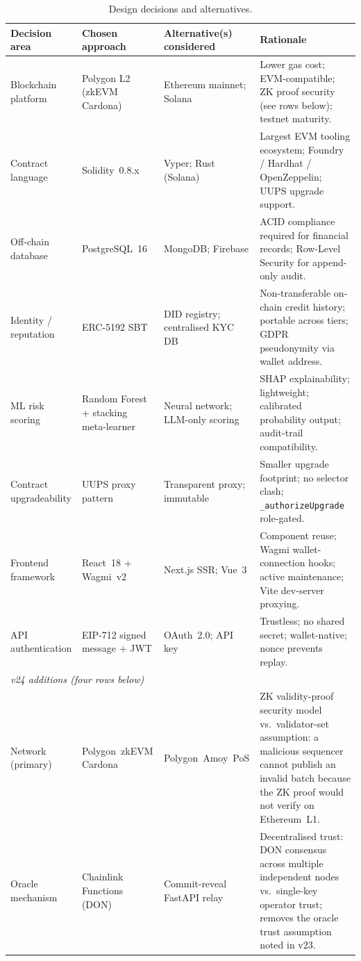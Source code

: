 \begin{table}[H]
\centering
\caption{Design decisions and alternatives.}
\label{tab:design-decisions}
\small
\renewcommand{\arraystretch}{1.3}
\begin{tabular}{p{2.8cm}p{2.9cm}p{2.9cm}p{3.7cm}}
\hline
\textbf{Decision area} & \textbf{Chosen approach} & \textbf{Alternative(s) considered} & \textbf{Rationale} \\
\hline
Blockchain platform  & Polygon L2 (zkEVM Cardona) & Ethereum mainnet; Solana & Lower gas cost; EVM-compatible; ZK proof security (see rows below); testnet maturity. \\
Contract language    & Solidity~0.8.x         & Vyper; Rust (Solana) & Largest EVM tooling ecosystem; Foundry / Hardhat / OpenZeppelin; UUPS upgrade support. \\
Off-chain database   & PostgreSQL~16            & MongoDB; Firebase       & ACID compliance required for financial records; Row-Level Security for append-only audit. \\
Identity / reputation & ERC-5192 SBT            & DID registry; centralised KYC DB & Non-transferable on-chain credit history; portable across tiers; GDPR pseudonymity via wallet address. \\
ML risk scoring      & Random Forest + stacking meta-learner & Neural network; LLM-only scoring & SHAP explainability; lightweight; calibrated probability output; audit-trail compatibility. \\
Contract upgradeability & UUPS proxy pattern    & Transparent proxy; immutable & Smaller upgrade footprint; no selector clash; \texttt{\_authorizeUpgrade} role-gated. \\
Frontend framework   & React~18 + Wagmi~v2     & Next.js SSR; Vue~3      & Component reuse; Wagmi wallet-connection hooks; active maintenance; Vite dev-server proxying. \\
API authentication   & EIP-712 signed message + JWT & OAuth~2.0; API key & Trustless; no shared secret; wallet-native; nonce prevents replay. \\
\hline
\multicolumn{4}{l}{\textit{v24 additions (four rows below)}} \\
\hline
Network (primary)    & Polygon~zkEVM Cardona   & Polygon~Amoy~PoS        & ZK validity-proof security model vs.\ validator-set assumption: a malicious sequencer cannot publish an invalid batch because the ZK proof would not verify on Ethereum~L1. \\
Oracle mechanism     & Chainlink Functions (DON) & Commit-reveal FastAPI relay & Decentralised trust: DON consensus across multiple independent nodes vs.\ single-key operator trust; removes the oracle trust assumption noted in v23. \\

\end{tabular}
\end{table}
